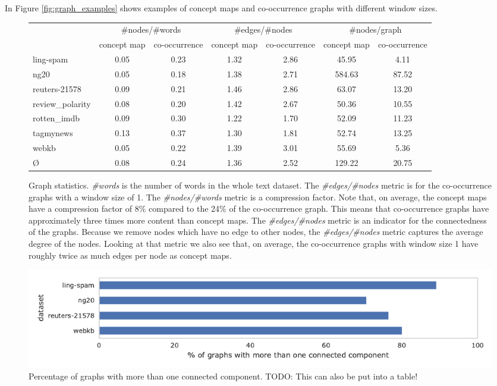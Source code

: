 In Figure \ref{fig:graph_examples} shows examples of concept maps and co-occurrence graphs with different window sizes.

\begin{figure}[ht]
\centering
\begin{tabular}{lcccccc}
{} &  \multicolumn{2}{c}{\#nodes/\#words} &  \multicolumn{2}{c}{\#edges/\#nodes} & \multicolumn{2}{c}{\#nodes/graph} \\
{} & concept map &  co-occurrence & concept map & co-occurrence & concept map & co-occurrence\\
\midrule
ling-spam       & 0.05 & 0.23 & 1.32 & 2.86 & 45.95 & 4.11 \\
ng20            & 0.05 & 0.18 & 1.38 & 2.71 & 584.63 & 87.52 \\
reuters-21578   & 0.09 & 0.21 & 1.46 & 2.86 & 63.07 & 13.20 \\
review\_polarity & 0.08 & 0.20 & 1.42 & 2.67 & 50.36 & 10.55 \\
rotten\_imdb     & 0.09 & 0.30 & 1.22 & 1.70 & 52.09 & 11.23 \\
tagmynews       & 0.13 & 0.37 & 1.30 & 1.81 & 52.74 & 13.25 \\
webkb           & 0.05 & 0.22 & 1.39 & 3.01 & 55.69 & 5.36 \\
\midrule
\O{}            & 0.08 & 0.24 & 1.36 & 2.52 & 129.22 & 20.75 \\
\bottomrule
\end{tabular}
\caption{Graph statistics. \textit{\#words} is the number of words in the whole text dataset. The \textit{\#edges/\#nodes} metric is for the co-occurrence graphs with a window size of 1. The \textit{\#nodes/\#words} metric is a compression factor. Note that, on average, the concept maps have a compression factor of 8\% compared to the 24\% of the co-occurrence graph. This means that co-occurrence graphs have approximately three times more content than concept maps. The \textit{\#edges/\#nodes} metric is an indicator for the connectedness of the graphs. Because we remove nodes which have no edge to other nodes, the \textit{\#edges/\#nodes} metric captures the average degree of the nodes. Looking at that metric we also see that, on average, the co-occurrence graphs with window size 1 have roughly twice as much edges per node as concept maps.}\label{fig:graph_statistics}
\end{figure}

\begin{figure}[ht]
\centering
\centering\includegraphics[width=1\linewidth]{assets/figures/percentage_more_than_one_connected_component.pdf}
\caption{Percentage of graphs with more than one connected component. TODO: This can also be put into a table!}\label{fig:percentage_more_than_one_connected_component}
\end{figure}

